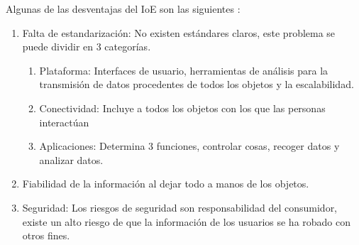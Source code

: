 
Algunas de las desventajas del IoE son las siguientes \cite{IoEOpenMindDos} \cite{IoEEspana}: \\

\begin{enumerate}
\item Falta de estandarización: No existen estándares claros, este problema se puede dividir en 3 categorías.  
	\begin{enumerate}
		\item Plataforma: Interfaces de usuario, herramientas de análisis para la transmisión de datos procedentes de todos los objetos y la escalabilidad.
		\item Conectividad: Incluye a todos los objetos con los que las personas interactúan 
		\item Aplicaciones: Determina 3 funciones, controlar cosas, recoger datos y analizar datos.
	\end{enumerate} 
\item Fiabilidad de la información al dejar todo a manos de los objetos.
\item Seguridad: Los riesgos de seguridad son responsabilidad del consumidor, existe un alto riesgo de que la información de los usuarios se ha robado con otros fines.
\end{enumerate}
